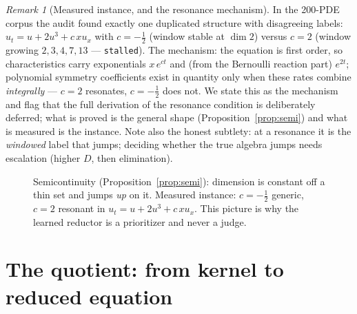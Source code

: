 \documentclass[11pt]{article}
\theoremstyle{plain}
\theoremstyle{definition}
\theoremstyle{remark}
\newtheorem{remark}[theorem]{Remark}
\begin{document}
\begin{remark}[Measured instance, and the resonance mechanism]\label{rem:resonance}
In the 200-PDE corpus the audit found exactly one duplicated structure with disagreeing labels:
$u_t=u+2u^3+c\,xu_x$ with $c=-\tfrac12$ (window stable at $\dim 2$) versus $c=2$ (window growing
$2,3,4,7,13$ --- \texttt{stalled}). The mechanism: the equation is first order, so characteristics
carry exponentials $x\,e^{ct}$ and (from the Bernoulli reaction part) $e^{2t}$; polynomial symmetry
coefficients exist in quantity only when these rates combine \emph{integrally} --- $c=2$ resonates,
$c=-\tfrac12$ does not. We state this as the mechanism and flag that the full derivation of the
resonance condition is deliberately deferred; what is proved is the general shape
(Proposition~\ref{prop:semi}) and what is measured is the instance. Note also the honest subtlety:
at a resonance it is the \emph{windowed} label that jumps; deciding whether the true algebra jumps
needs escalation (higher $D$, then elimination).
\end{remark}

\begin{figure}[ht]\centering
{}
\caption{Semicontinuity (Proposition~\ref{prop:semi}): dimension is constant off a thin set and
jumps \emph{up} on it. Measured instance: $c=-\tfrac12$ generic, $c=2$ resonant in
$u_t=u+2u^3+c\,xu_x$. This picture is why the learned reductor is a prioritizer and never a judge.}
\label{fig:jump}
\end{figure}

\section{The quotient: from kernel to reduced equation}\label{sec:quotient}
\end{document}
